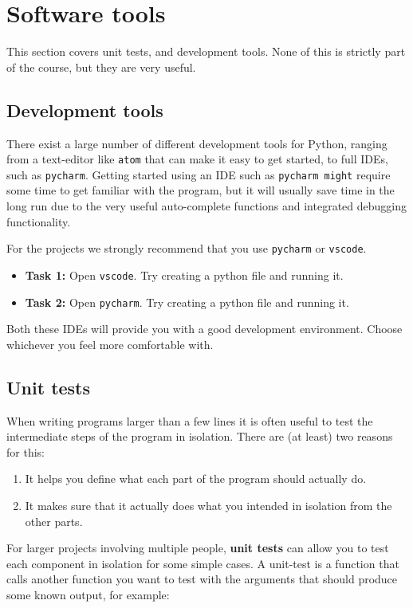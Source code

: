 \documentclass[a4paper, 10pt]{article}
\begin{document}
\section{Software tools}
This section covers unit tests, and development tools.
None of this is strictly part of the course, but they are very useful.

\subsection{Development tools}
There exist a large number of different development tools for Python, ranging from a text-editor like \texttt{atom} that can make it easy to get started, to full IDEs, such as
\texttt{pycharm}.
Getting started using an IDE such as \texttt{pycharm might} require some time to get familiar with the program, but it will usually save time in the long run due to the very useful auto-complete functions and integrated debugging functionality.

For the projects we strongly recommend that you use \texttt{pycharm} or \texttt{vscode}.

\begin{itemize}
	\item \textbf{Task 1:} Open \texttt{vscode}. Try creating a python file and running it.
	\item \textbf{Task 2:} Open \texttt{pycharm}. Try creating a python file and running it.
\end{itemize}

Both these IDEs will provide you with a good development environment.
Choose whichever you feel more comfortable with.

\subsection{Unit tests}
When writing programs larger than a few lines it is often useful to test the intermediate steps of the program in isolation.
There are (at least) two reasons for this:
\begin{enumerate}
	\item It helps you define what each part of the program should actually do.
	\item It makes sure that it actually does what you intended in isolation from the other parts.
\end{enumerate}


For larger projects involving multiple people, \textbf{unit tests} can allow you to test each component in isolation for some simple cases.
A unit-test is a function that calls another function you want to test with the arguments that should produce some known output, for example:
\end{document}
